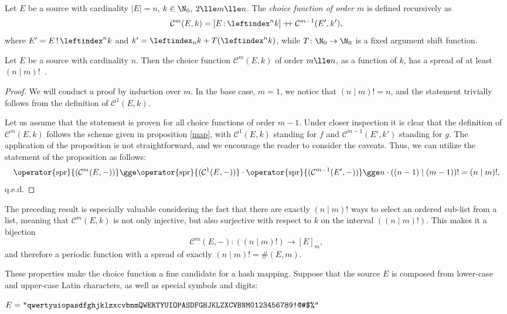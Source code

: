 \documentclass[12pt, a4paper]{article}
\renewcommand{\C}{\mathcal{C}}
\newcommand{\dop}{\mathbin{{+}\hspace{-1mm}{+}}}
\newcommand{\spr}[1]{\operator{\mathrm{spr}}{(#1)}}
\newcommand{\lli}[1]{\leftindex_{#1}}
\newcommand{\lui}[1]{\leftindex^{#1}}
\newcommand{\elt}{\mathop{:}}
\newcommand{\wo}{\mathop{!}}
\begin{document}
\begin{definition}
    Let $ E $ be a source with cardinality $ |E| = n $, $ k \in \N_0 $, $ 2 \lle m \lle n $. The \emph{choice function of order $ m $} is defined recursively as
    \[ \C^m(E, k) = [E \elt \lui{n}k] \dop \C^{m-1}(E', k'), \]
    where $ E' = E \wo \lui{n}k $ and $ k' = \lli{n}k + T(\lui{n}k) $, while $ T \colon \N_0 \to \N_0 $ is a fixed argument shift function.
\end{definition}

\begin{proposition}
    Let $ E $ be a source with cardinality $ n $. Then the choice function $ \C^m(E, k) $ of order $ m \lle n $, as a function of $ k $, has a spread of at least $ (n \mid m)! $\ .
\end{proposition}
\begin{proof}
    We will conduct a proof by induction over $ m $. In the base case, $ m = 1 $, we notice that $ (n \mid m)! = n $, and the statement trivially follows from the definition of $ \C^1(E, k) $.

    Let us assume that the statement is proven for all choice functions of order $ m - 1 $. Under closer inspection it is clear that the definition of $ \C^m(E, k) $ follows the scheme given in proposition \ref{map}, with $ \C^1(E, k) $ standing for $ f $ and $ \C^{m-1}(E', k') $ standing for $ g $. The application of the proposition is not straightforward, and we encourage the reader to consider the caveats. Thus, we can utilize the statement of the proposition as follows:
    \[ \spr{\C^m(E, -)} \gge \spr{\C^1(E, -)} \cdot \spr{\C^{m-1}(E', -)} \gge n \cdot ((n-1) \mid (m-1))! = (n \mid m)!, \]
    q.e.d.
\end{proof}

The preceding result is especially valuable considering the fact that there are exactly $ (n \mid m)! $ ways to select an ordered sub-list from a list, meaning that $ \C^m(E, k) $ is not only injective, but also surjective with respect to $ k $ on the interval $ ((n \mid m)!) $. This makes it a bijection
\[ \C^m(E, -) \colon ((n \mid m)!) \to [E]_m, \]
and therefore a periodic function with a spread of exactly $ (n \mid m)! = \#(E, m) $.

These properties make the choice function a fine candidate for a hash mapping. Suppose that the source $ E $ is composed from lower-case and upper-case Latin characters, as well as special symbols and digits:

\begin{center}
    $ E = \mbox{\texttt{"qwertyuiopasdfghjklzxcvbnmQWERTYUIOPASDFGHJKLZXCVBNM0123456789!@\#\$\%"}} $
\end{center}
\end{document}
